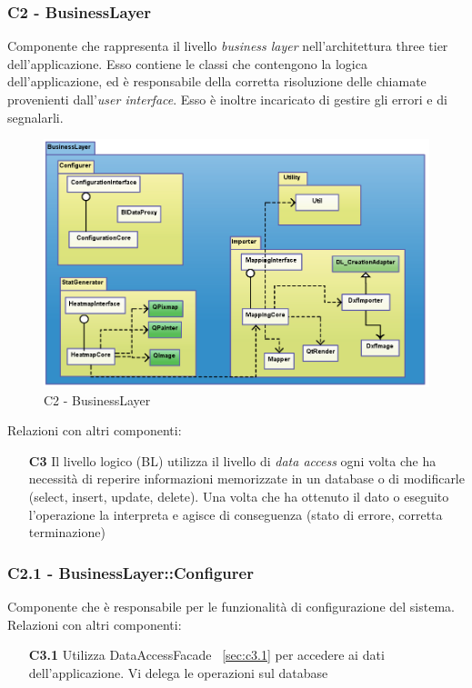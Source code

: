 \subsubsection{C2 - BusinessLayer} \label{sec:c2}
Componente che rappresenta il livello \textit{business layer} nell'architettura three tier dell'applicazione. Esso contiene le classi che contengono la logica dell'applicazione, ed è responsabile della corretta risoluzione delle chiamate provenienti dall'\textit{user interface}. Esso è inoltre incaricato di gestire gli errori e di segnalarli.
\\
\begin{figure}[!h] 

        \centering 

        \includegraphics[scale=0.4]{./images/c2.png} 

        \caption{C2 - BusinessLayer} 

        \label{fig:c2}

        \end{figure} 

Relazioni con altri componenti: 
\begin{itemize} 
\item [\textbf{C3}]
Il livello logico (BL) utilizza il livello di \textit{data access} ogni volta che ha necessità di reperire informazioni memorizzate in un database o di modificarle (select, insert, update, delete). Una volta che ha ottenuto il dato o eseguito l'operazione la interpreta e agisce di conseguenza (stato di errore, corretta terminazione) 
\end{itemize} 

\subsubsection{C2.1 - BusinessLayer::Configurer} \label{sec:c2.1}
Componente che è responsabile per le funzionalità di configurazione del sistema.\\
Relazioni con altri componenti: 
\begin{itemize} 
\item [\textbf{C3.1}]
Utilizza DataAccessFacade ~\ref{sec:c3.1} per accedere ai dati dell'applicazione. Vi delega le operazioni sul database 
\end{itemize} 

